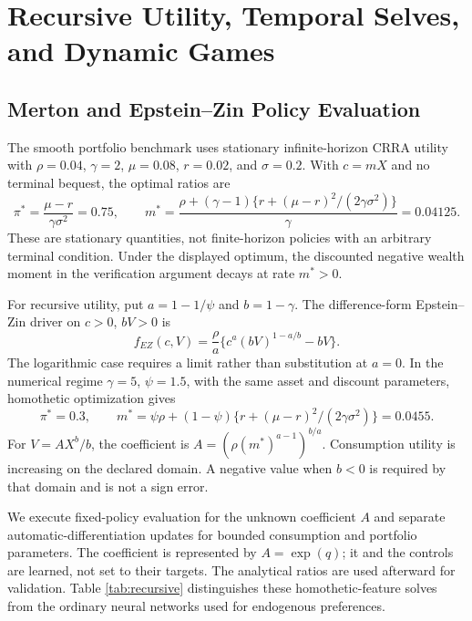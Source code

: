\section{Recursive Utility, Temporal Selves, and Dynamic Games}
\label{sec:extensions}
\subsection{Merton and Epstein--Zin Policy Evaluation}
The smooth portfolio benchmark uses stationary infinite-horizon CRRA utility with $\rho=0.04$, $\gamma=2$, $\mu=0.08$, $r=0.02$, and $\sigma=0.2$. With $c=mX$ and no terminal bequest, the optimal ratios are
\begin{equation}
 \pi^*=\frac{\mu-r}{\gamma\sigma^2}=0.75,\qquad
 m^*=\frac{\rho+(\gamma-1)\{r+(\mu-r)^2/(2\gamma\sigma^2)\}}{\gamma}=0.04125.
 \label{eq:merton_targets}
\end{equation}
These are stationary quantities, not finite-horizon policies with an arbitrary terminal condition. Under the displayed optimum, the discounted negative wealth moment in the verification argument decays at rate $m^*>0$.

For recursive utility, put $a=1-1/\psi$ and $b=1-\gamma$. The difference-form Epstein--Zin driver on $c>0$, $bV>0$ is
\begin{equation}
 f_{EZ}(c,V)=\frac{\rho}{a}\{c^a(bV)^{1-a/b}-bV\}.
 \label{eq:EZ}
\end{equation}
The logarithmic case requires a limit rather than substitution at $a=0$. In the numerical regime $\gamma=5$, $\psi=1.5$, with the same asset and discount parameters, homothetic optimization gives
\begin{equation}
 \pi^*=0.3,\qquad
 m^*=\psi\rho+(1-\psi)\{r+(\mu-r)^2/(2\gamma\sigma^2)\}=0.0455.
 \label{eq:EZ_targets}
\end{equation}
For $V=A X^b/b$, the coefficient is $A=(\rho(m^*)^{a-1})^{b/a}$. Consumption utility is increasing on the declared domain. A negative value when $b<0$ is required by that domain and is not a sign error.

We execute fixed-policy evaluation for the unknown coefficient $A$ and separate automatic-differentiation updates for bounded consumption and portfolio parameters. The coefficient is represented by $A=\exp(q)$; it and the controls are learned, not set to their targets. The analytical ratios are used afterward for validation. Table \ref{tab:recursive} distinguishes these homothetic-feature solves from the ordinary neural networks used for endogenous preferences.


